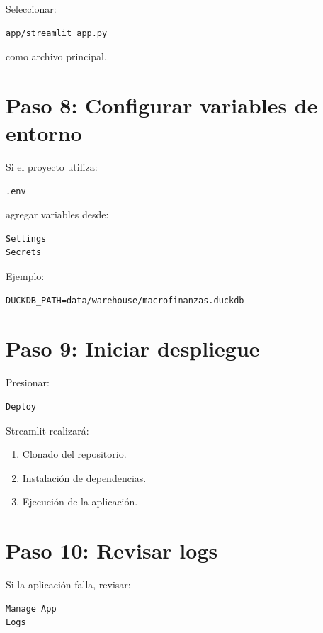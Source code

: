 Seleccionar:

\begin{verbatim}
app/streamlit_app.py
\end{verbatim}

como archivo principal.

\section{Paso 8: Configurar variables de entorno}

Si el proyecto utiliza:

\begin{verbatim}
.env
\end{verbatim}

agregar variables desde:

\begin{verbatim}
Settings
Secrets
\end{verbatim}

Ejemplo:

\begin{verbatim}
DUCKDB_PATH=data/warehouse/macrofinanzas.duckdb
\end{verbatim}

\section{Paso 9: Iniciar despliegue}

Presionar:

\begin{verbatim}
Deploy
\end{verbatim}

Streamlit realizará:

\begin{enumerate}
\item Clonado del repositorio.
\item Instalación de dependencias.
\item Ejecución de la aplicación.
\end{enumerate}

\section{Paso 10: Revisar logs}

Si la aplicación falla, revisar:

\begin{verbatim}
Manage App
Logs
\end{verbatim}


